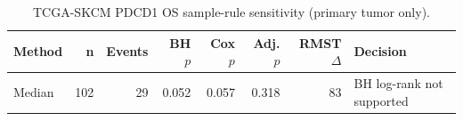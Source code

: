 \begin{table}[t]
\centering
\caption{TCGA-SKCM PDCD1 OS sample-rule sensitivity (primary tumor only).}
\label{tab:skcm-pdcd1-os-primary-tumor-only}
\begin{tabular}{lrrrrrrl}
\toprule
Method & n & Events & BH $p$ & Cox $p$ & Adj. $p$ & RMST $\Delta$ & Decision \\
\midrule
Median & 102 & 29 & 0.052 & 0.057 & 0.318 & 83 & BH log-rank not supported \\
\bottomrule
\end{tabular}
\end{table}
